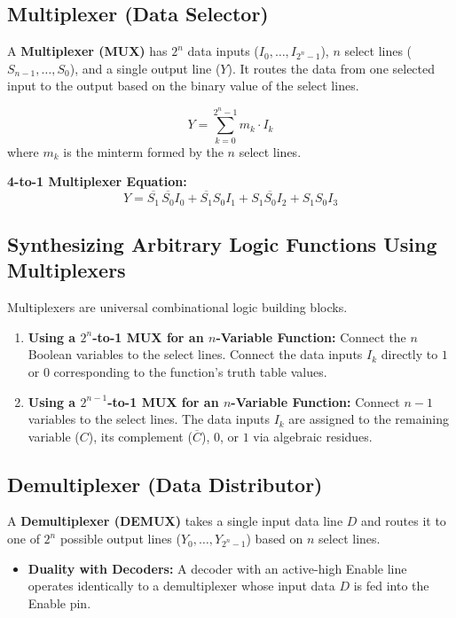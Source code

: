 \subsection{Multiplexer (Data Selector)}
A \textbf{Multiplexer (MUX)} has $2^n$ data inputs ($I_0, \dots, I_{2^n-1}$), $n$ select lines ($S_{n-1}, \dots, S_0$), and a single output line ($Y$). It routes the data from one selected input to the output based on the binary value of the select lines.

\begin{equation}
\label{eq:mux_general}
Y = \sum_{k=0}^{2^n-1} m_k \cdot I_k
\end{equation}
where $m_k$ is the minterm formed by the $n$ select lines.

\textbf{4-to-1 Multiplexer Equation:}
\begin{equation}
\label{eq:mux_4to1}
Y = \overline{S_1}\,\overline{S_0} I_0 + \overline{S_1} S_0 I_1 + S_1 \overline{S_0} I_2 + S_1 S_0 I_3
\end{equation}

\subsection{Synthesizing Arbitrary Logic Functions Using Multiplexers}
Multiplexers are universal combinational logic building blocks.
\begin{enumerate}[label=\bfseries\arabic*.]
    \item \textbf{Using a $2^n$-to-1 MUX for an $n$-Variable Function:}
    Connect the $n$ Boolean variables to the select lines. Connect the data inputs $I_k$ directly to $1$ or $0$ corresponding to the function's truth table values.
    \item \textbf{Using a $2^{n-1}$-to-1 MUX for an $n$-Variable Function:}
    Connect $n-1$ variables to the select lines. The data inputs $I_k$ are assigned to the remaining variable ($C$), its complement ($\overline{C}$), $0$, or $1$ via algebraic residues.
\end{enumerate}

\subsection{Demultiplexer (Data Distributor)}
A \textbf{Demultiplexer (DEMUX)} takes a single input data line $D$ and routes it to one of $2^n$ possible output lines ($Y_0, \dots, Y_{2^n-1}$) based on $n$ select lines.
\begin{itemize}
    \item \textbf{Duality with Decoders:} A decoder with an active-high Enable line operates identically to a demultiplexer whose input data $D$ is fed into the Enable pin.
\end{itemize}


